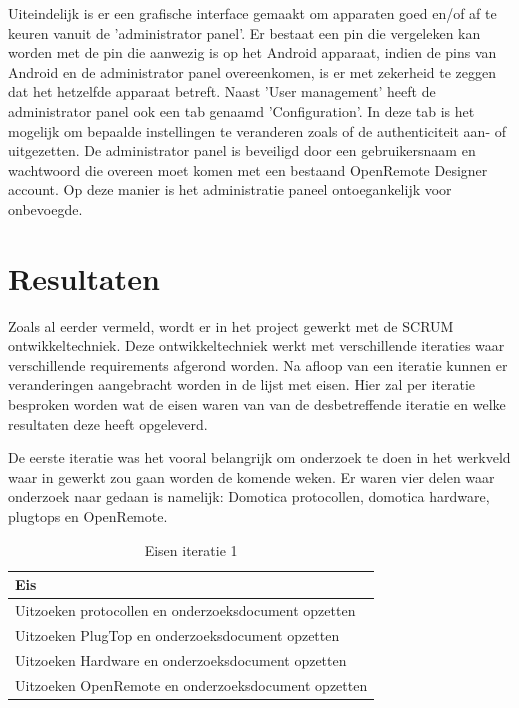 \documentclass{article}
\begin{document}
Uiteindelijk is er een grafische interface gemaakt om apparaten goed en/of
af te keuren vanuit de 'administrator panel'. Er bestaat een pin die
vergeleken kan worden met de pin die aanwezig is op het Android apparaat,
indien de pins van Android en de administrator panel overeenkomen, is er
met zekerheid te zeggen dat het hetzelfde apparaat betreft. Naast 'User
management' heeft de administrator panel ook een tab genaamd
'Configuration'. In deze tab is het mogelijk om bepaalde instellingen te
veranderen zoals of de authenticiteit aan- of uitgezetten. De administrator
panel is beveiligd door een gebruikersnaam en wachtwoord die overeen moet
komen met een bestaand OpenRemote Designer account. Op deze manier is het
administratie paneel ontoegankelijk voor onbevoegde.

\newpage
\section{Resultaten}

Zoals al eerder vermeld, wordt er in het project gewerkt met de SCRUM
ontwikkeltechniek. Deze ontwikkeltechniek werkt met verschillende iteraties
waar verschillende requirements afgerond worden. Na afloop van een iteratie
kunnen er veranderingen aangebracht worden in de lijst met eisen. Hier zal
per iteratie besproken worden wat de eisen waren van van de desbetreffende
iteratie en welke resultaten deze heeft opgeleverd.

De eerste iteratie was het vooral belangrijk om onderzoek te doen in het
werkveld waar in gewerkt zou gaan worden de komende weken. Er waren vier
delen waar onderzoek naar gedaan is namelijk: Domotica protocollen,
domotica hardware, plugtops en OpenRemote.
  
\begin{table}[h!]
  \caption{Eisen iteratie 1}
  \begin{center}
    \begin{tabular}{|| l ||}\hline
        Eis                                                  \\\hline\hline
        Uitzoeken protocollen en onderzoeksdocument opzetten \\\hline
        Uitzoeken PlugTop en onderzoeksdocument opzetten     \\\hline
        Uitzoeken Hardware en onderzoeksdocument opzetten    \\\hline
        Uitzoeken OpenRemote en onderzoeksdocument opzetten  \\\hline
    \end{tabular}
  \end{center}
\end{table}
\end{document}
